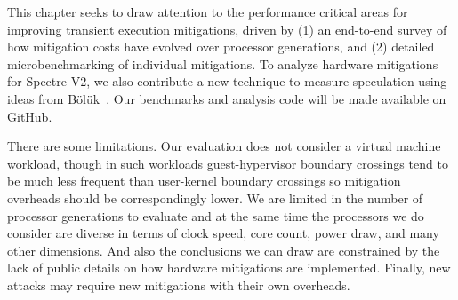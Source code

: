 This chapter seeks to draw attention to the performance critical areas for improving transient execution mitigations, driven by (1) an end-to-end survey of how mitigation costs have evolved over processor generations, and (2) detailed microbenchmarking of individual mitigations.
To analyze hardware mitigations for Spectre V2, we also contribute a new technique to measure speculation using ideas from Bölük~\cite{speculating-x86}.
Our benchmarks and analysis code will be made available on GitHub.

There are some limitations.
Our evaluation does not consider a virtual machine workload, though in such workloads guest-hypervisor boundary crossings tend to be much less frequent than user-kernel boundary crossings so mitigation overheads should be correspondingly lower.
We are limited in the number of processor generations to evaluate and at the same time the processors we do consider are diverse in terms of clock speed, core count, power draw, and many other dimensions.
And also the conclusions we can draw are constrained by the lack of
public details on how hardware mitigations are implemented.  Finally,
new attacks may require new mitigations with their own overheads.






